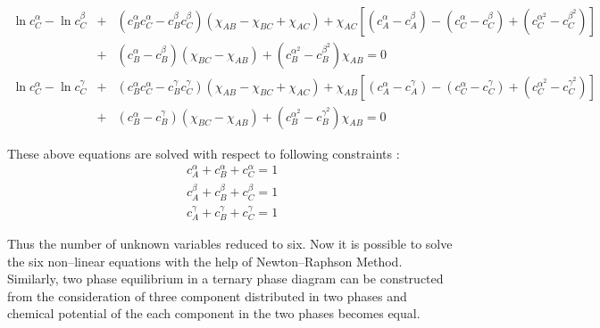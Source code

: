 \documentclass[12pt]{iiscthes}
\theoremstyle{definition}
\theoremstyle{definition}
\theoremstyle{remark}
\begin{document}
\begin{appendices}
\begin{eqnarray}
\end{eqnarray} 
\begin{eqnarray}\label{f5}
\ln c_C^\alpha-\ln c_C^\beta&+&\left(c_B^\alpha c_C^\alpha - c_B^\beta c_C^\beta\right)\left(\chi_{AB}-\chi_{BC}+\chi_{AC}\right)+\chi_{AC}\left[\left(c_A^\alpha-c_A^\beta\right)-\left(c_C^\alpha-c_C^\beta\right)+\left(c_C^{\alpha^2}-c_C^{\beta^2}\right)\right]\nonumber\\
&+&\left(c_B^\alpha-c_B^\beta\right)\left(\chi_{BC}-\chi_{AB}\right)+\left(c_B^{\alpha^2}-c_B^{\beta^2}\right)\chi_{AB} = 0
\end{eqnarray}
\begin{eqnarray}\label{f6}
\ln c_C^\alpha-\ln c_C^\gamma&+&\left(c_B^\alpha c_C^\alpha - c_B^\gamma c_C^\gamma\right)\left(\chi_{AB}-\chi_{BC}+\chi_{AC}\right)+\chi_{AB}\left[\left(c_A^\alpha-c_A^\gamma\right)-\left(c_C^\alpha-c_C^\gamma\right)+\left(c_C^{\alpha^2}-c_C^{\gamma^2}\right)\right]\nonumber\\
&+&\left(c_B^\alpha-c_B^\gamma\right)\left(\chi_{BC}-\chi_{AB}\right)+\left(c_B^{\alpha^2}-c_B^{\gamma^2}\right)\chi_{AB} = 0
\end{eqnarray} 

These above equations are solved with respect to following constraints :
\begin{eqnarray}
c_A^\alpha + c_B^\alpha + c_C^\alpha = 1 \nonumber\\
c_A^\beta + c_B^\beta + c_C^\beta = 1 \nonumber\\
c_A^\gamma + c_B^\gamma + c_C^\gamma = 1 
\end{eqnarray}

Thus the number of unknown variables reduced to six. Now it is possible to solve the six non--linear equations with the help of Newton--Raphson Method.  Similarly, two phase equilibrium in a ternary phase diagram can be constructed from the consideration of three component distributed in two phases and chemical potential of the each component in the two phases becomes equal.

\end{appendices}
\end{document}
